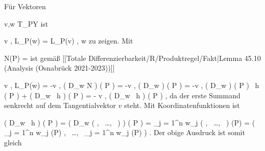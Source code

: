 {

Für Vektoren

\mavergleichskette
{\vergleichskette
{ v,w
}
{ \in }{ T_PY
}
{  }{
}
{    }{
}
{   }{
}
}
{}{}{}
ist

\mavergleichskettedisp
{\vergleichskette
{ \left\langle  v  ,  L_P(w)  \right\rangle
}
{ =} { \left\langle L_P(v) ,  w  \right\rangle
}
{ } {
}
{ } {
}
{ } {
}
}
{}{}{}
zu zeigen. Mit

\mavergleichskette
{\vergleichskette
{ N(P)
}
{ = }{ {  }
}
{  }{
}
{    }{
}
{   }{
}
}
{}{}{}
ist gemäß
[[Totale Differenzierbarkeit/R/Produktregel/Fakt|Lemma 45.10 (Analysis (Osnabrück 2021-2023))]]

\mavergleichskettealignhandlinks
{\vergleichskettealignhandlinks
{ \left\langle  v  ,  L_P(w)  \right\rangle
}
{ =} { -\left\langle  v  ,  \left(  D_{w}  N   \right) \left(   P   \right)   \right\rangle
}
{ =} { -\left\langle  v  ,  \left(  D_{w}  {  }   \right) \left(   P   \right)     \right\rangle
}
{ =} { -\left\langle  v  ,  \left(  D_{w}  {  }   \right) \left(   P   \right) \cdot
{} \,  h  (  P ) + {  } \cdot  \left(  D_{w}
 \,  h   \right) \left(   P   \right)   \right\rangle
}
{ =} { - {  } \left\langle  v  ,  \left(  D_{w}
 \,  h   \right) \left(   P   \right)    \right\rangle
}
}
{}
{}{,}
da der erste Summand senkrecht auf dem Tangentialvektor $v$ steht. Mit Koordinatenfunktionen ist

\mavergleichskettealignhandlinks
{\vergleichskettealignhandlinks
{ \left(  D_{w}
 \,  h   \right) \left(   P   \right)
}
{ =} { \left(  D_{w}  \left(  {  }   , \,   \ldots  , \,   {  }                 \right)    \right) \left(   P   \right)
}
{ =} { \sum_{j = 1}^n  w_j  {  }  \left(  {  }   , \,   \ldots  , \,   {  }                 \right) (P)
}
{ =} { \left(  \sum_{j = 1}^n  w_j  {  }  {  } (P)   , \,   \ldots  , \,   \sum_{j = 1}^n  w_j  {  }  {  } (P)                 \right)
}
{ } {
}
}
{}
{}{.}
Der obige Ausdruck ist somit gleich

}
